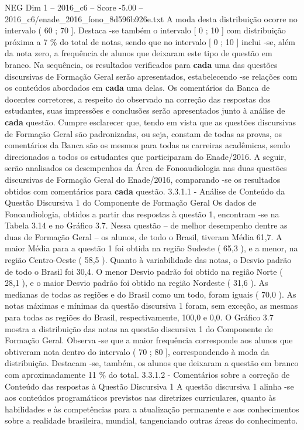 \begin{textsample}{NEG Dim 1 – 2016\_c6 – Score -5.00 – 2016\_c6/enade\_2016\_fono\_8d596b926e.txt}
A moda desta distribuição ocorre no intervalo ( 60 ; 70 ].
Destaca -se também o intervalo [ 0 ; 10 ] com distribuição próxima a 7 \% do total de notas, sendo que no intervalo [ 0 ; 10 ] inclui -se, além da nota zero, a frequência de alunos que deixaram este tipo de questão em branco.
Na sequência, os resultados verificados para \textbf{cada} uma das questões discursivas de Formação Geral serão apresentados, estabelecendo -se relações com os conteúdos abordados em \textbf{cada} uma delas.
Os comentários da Banca de docentes corretores, a respeito do observado na correção das respostas dos estudantes, suas impressões e conclusões serão apresentados junto à análise de \textbf{cada} questão.
Cumpre esclarecer que, tendo em vista que as questões discursivas de Formação Geral são padronizadas, ou seja, constam de todas as provas, os comentários da Banca são os mesmos para todas as carreiras acadêmicas, sendo direcionados a todos os estudantes que participaram do Enade/2016.
A seguir, serão analisados os desempenhos da Área de Fonoaudiologia nas duas questões discursivas de Formação Geral do Enade/2016, comparando -se os resultados obtidos com comentários para \textbf{cada} questão. 3.3.1.1 - Análise de Conteúdo da Questão Discursiva 1 do Componente de Formação Geral Os dados de Fonoaudiologia, obtidos a partir das respostas à questão 1, encontram -se na Tabela 3.14 e no Gráfico 3.7.
Nessa questão – de melhor desempenho dentre as duas de Formação Geral – os alunos, de todo o Brasil, tiveram Média 61,7.
A maior Média para a questão 1 foi obtida na região Sudeste ( 65,3 ), e a menor, na região Centro-Oeste ( 58,5 ).
Quanto à variabilidade das notas, o Desvio padrão de todo o Brasil foi 30,4.
O menor Desvio padrão foi obtido na região Norte ( 28,1 ), e o maior Desvio padrão foi obtido na região Nordeste ( 31,6 ).
As medianas de todas as regiões e do Brasil como um todo, foram iguais ( 70,0 ).
As notas máximas e mínimas da questão discursiva 1 foram, sem exceção, as mesmas para todas as regiões do Brasil, respectivamente, 100,0 e 0,0.
O Gráfico 3.7 mostra a distribuição das notas na questão discursiva 1 do Componente de Formação Geral.
Observa -se que a maior frequência corresponde aos alunos que obtiveram nota dentro do intervalo ( 70 ; 80 ], correspondendo à moda da distribuição.
Destacam -se, também, os alunos que deixaram a questão em branco com aproximadamente 11 \% do total. 3.3.1.2 - Comentários sobre a correção de Conteúdo das respostas à Questão Discursiva 1 A questão discursiva 1 alinha -se aos conteúdos programáticos previstos nas diretrizes curriculares, quanto às habilidades e às competências para a atualização permanente e aos conhecimentos sobre a realidade brasileira, mundial, tangenciando outras áreas do conhecimento.

\end{textsample}
